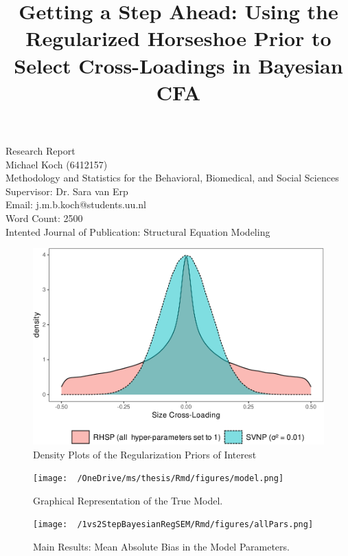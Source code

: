 \documentclass[
  english,
  man]{apa6}
\title{Getting a Step Ahead: Using the Regularized Horseshoe Prior to Select Cross-Loadings in Bayesian CFA}
\author{\phantom{0}}
\date{}
\affiliation{\phantom{0}}
\begin{document}
\maketitle

\vfill
Research Report\\
Michael Koch (6412157)\\
Methodology and Statistics for the Behavioral, Biomedical, and Social Sciences \\
Supervisor: Dr. Sara van Erp \\ 
Email: j.m.b.koch@students.uu.nl \\
Word Count: 2500 \\
Intented Journal of Publication: Structural Equation Modeling \\

\setcounter{page}{0}
\thispagestyle{empty}
\pagestyle{plain}

\clearpage

\begin{figure}
\centering
\includegraphics{JMBKoch_report_files/figure-latex/unnamed-chunk-1-1.pdf}
\caption{\label{fig:unnamed-chunk-1}Density Plots of the Regularization Priors of Interest}
\end{figure}

\begin{figure}
\centering
\texttt{[image: ~/OneDrive/ms/thesis/Rmd/figures/model.png]}
\caption{Graphical Representation of the True Model.}
\end{figure}

\begin{figure}
\centering
\texttt{[image: ~/1vs2StepBayesianRegSEM/Rmd/figures/allPars.png]}
\caption{Main Results: Mean Absolute Bias in the Model Parameters.}
\end{figure}
\end{document}
